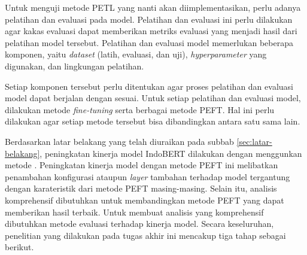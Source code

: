 Untuk menguji metode PETL yang nanti akan diimplementasikan, perlu adanya pelatihan dan evaluasi pada model. Pelatihan dan evaluasi ini perlu dilakukan agar kakas evaluasi dapat memberikan metriks evaluasi yang menjadi hasil dari pelatihan model tersebut. Pelatihan dan evaluasi model memerlukan beberapa komponen, yaitu \textit{dataset} (latih, evaluasi, dan uji), \textit{hyperparameter} yang digunakan, dan lingkungan pelatihan.

Setiap komponen tersebut perlu ditentukan agar proses pelatihan dan evaluasi model dapat berjalan dengan sesuai. Untuk setiap pelatihan dan evaluasi model, dilakukan metode \textit{fine-tuning} serta berbagai metode PEFT. Hal ini perlu dilakukan agar setiap metode tersebut bisa dibandingkan antara satu sama lain.


Berdasarkan latar belakang yang telah diuraikan pada subbab \ref{sec:latar-belakang}, peningkatan kinerja model IndoBERT dilakukan dengan menggunkan metode \PEFT. Peningkatan kinerja model dengan metode PEFT ini melibatkan penambahan konfigurasi ataupun \textit{layer} tambahan terhadap model tergantung dengan karateristik dari metode PEFT masing-masing. Selain itu, analisis komprehensif dibutuhkan untuk membandingkan metode PEFT yang dapat memberikan hasil terbaik. Untuk membuat analisis yang komprehensif dibutuhkan metode evaluasi terhadap kinerja model. Secara keseluruhan, penelitian yang dilakukan pada tugas akhir ini mencakup tiga tahap sebagai berikut.


